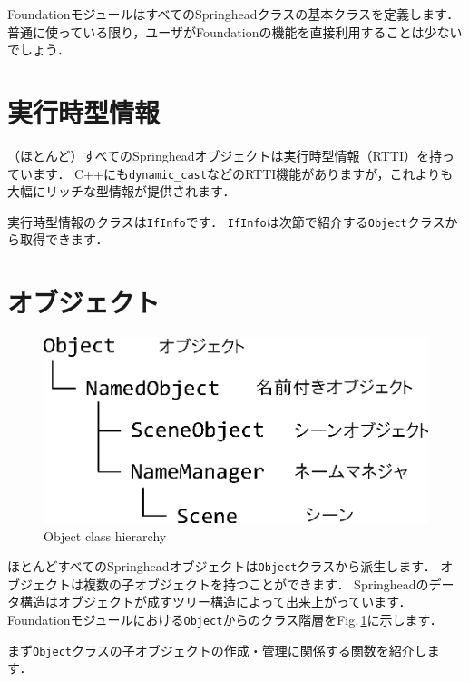 Foundation\KLUDGE モジュールはすべてのSpringhead\KLUDGE クラスの基本クラスを定義します．
\KLUDGE 普通に使っている限り，ユーザがFoundation\KLUDGE の機能を直接利用することは少ないでしょう．

\section{\KLUDGE 実行時型情報}

\KLUDGE （ほとんど）すべてのSpringhead\KLUDGE オブジェクトは実行時型情報（RTTI\KLUDGE ）を持っています．
C++\KLUDGE にも\texttt{dynamic\_cast}\KLUDGE などのRTTI\KLUDGE 機能がありますが，これよりも大幅にリッチな型情報が提供されます．

\KLUDGE 実行時型情報のクラスは\texttt{IfInfo}\KLUDGE です．
\texttt{IfInfo}\KLUDGE は次節で紹介する\texttt{Object}\KLUDGE クラスから取得できます．

\section{\KLUDGE オブジェクト}

\begin{figure}[t]
\begin{center}
\includegraphics[width=.5\hsize]{fig/utclass.eps}
\end{center}
\caption{Object class hierarchy}
\label{fig_utclass}
\end{figure}

\KLUDGE ほとんどすべてのSpringhead\KLUDGE オブジェクトは\texttt{Object}\KLUDGE クラスから派生します．
\KLUDGE オブジェクトは複数の子オブジェクトを持つことができます．
Springhead\KLUDGE のデータ構造はオブジェクトが成すツリー構造によって出来上がっています．
Foundation\KLUDGE モジュールにおける\texttt{Object}\KLUDGE からのクラス階層をFig.\,\ref{fig_utclass}\KLUDGE に示します．

\KLUDGE まず\texttt{Object}\KLUDGE クラスの子オブジェクトの作成・管理に関係する関数を紹介します．

